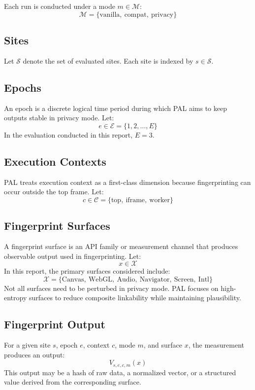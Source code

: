 \documentclass[11pt]{report}
\begin{document}
Each run is conducted under a mode $m \in \mathcal{M}$:
\[
\mathcal{M} = \{\text{vanilla},\ \text{compat},\ \text{privacy}\}
\]

\subsection{Sites}

Let $\mathcal{S}$ denote the set of evaluated sites. Each site is indexed by $s \in \mathcal{S}$.

\subsection{Epochs}

An epoch is a discrete logical time period during which PAL aims to keep outputs stable in privacy mode. Let:
\[
e \in \mathcal{E} = \{1, 2, \dots, E\}
\]
In the evaluation conducted in this report, $E = 3$.

\subsection{Execution Contexts}

PAL treats execution context as a first-class dimension because fingerprinting can occur outside the top frame. Let:
\[
c \in \mathcal{C} = \{\text{top},\ \text{iframe},\ \text{worker}\}
\]

\subsection{Fingerprint Surfaces}

A fingerprint surface is an API family or measurement channel that produces observable output used in fingerprinting. Let:
\[
x \in \mathcal{X}
\]
In this report, the primary surfaces considered include:
\[
\mathcal{X} = \{\text{Canvas},\ \text{WebGL},\ \text{Audio},\ \text{Navigator},\ \text{Screen},\ \text{Intl}\}
\]
Not all surfaces need to be perturbed in privacy mode. PAL focuses on high-entropy surfaces to reduce composite linkability while maintaining plausibility.

\subsection{Fingerprint Output}

For a given site $s$, epoch $e$, context $c$, mode $m$, and surface $x$, the measurement produces an output:
\[
V_{s,e,c,m}(x)
\]
This output may be a hash of raw data, a normalized vector, or a structured value derived from the corresponding surface.
\end{document}
